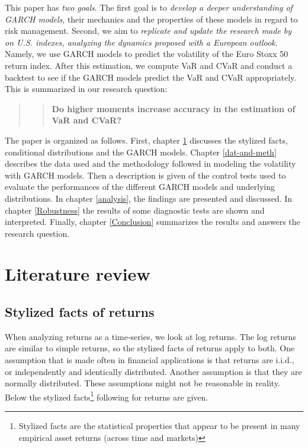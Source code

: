 \documentclass[a4paper, nobind]{templates/ociamthesis}
\begin{document}
\noindent This paper has \emph{two goals}. The first goal is to \emph{develop a deeper understanding of GARCH models}, their mechanics and the properties of these models in regard to risk management. Second, we aim to \emph{replicate and update the research made by \textcite{bali2008} on U.S. indexes, analyzing the dynamics proposed with a European outlook}. Namely, we use GARCH models to predict the volatility of the Euro Stoxx 50 return index. After this estimation, we compute VaR and CVaR and conduct a backtest to see if the GARCH models predict the VaR and CVaR appropriately. This is summarized in our research question:

\begin{quote}
\begin{quote}
\textbf{Do higher moments increase accuracy in the estimation of VaR and CVaR?}
\end{quote}
\end{quote}

\noindent The paper is organized as follows. First, chapter \ref{lit-rev} discusses the stylized facts, conditional distributions and the GARCH models. Chapter \ref{dat-and-meth} describes the data used and the methodology followed in modeling the volatility with GARCH models. Then a description is given of the control tests used to evaluate the performances of the different GARCH models and underlying distributions. In chapter \ref{analysis}, the findings are presented and discussed. In chapter \ref{Robustness} the results of some diagnostic tests are shown and interpreted. Finally, chapter \ref{Conclusion} summarizes the results and answers the research question.

\hypertarget{lit-rev}{%
\chapter{Literature review}\label{lit-rev}}

\minitoc 

\hypertarget{styl-facts}{%
\section{Stylized facts of returns}\label{styl-facts}}

\noindent When analyzing returns as a time-series, we look at log returns. The log returns are similar to simple returns, so the stylized facts of returns apply to both. One assumption that is made often in financial applications is that returns are i.i.d., or independently and identically distributed. Another assumption is that they are normally distributed. These assumptions might not be reasonable in reality. Below the stylized facts\footnote{Stylized facts are the statistical properties that appear to be present in many empirical asset returns (across time and markets)} following \textcite{annaert2021} for returns are given.
\end{document}
